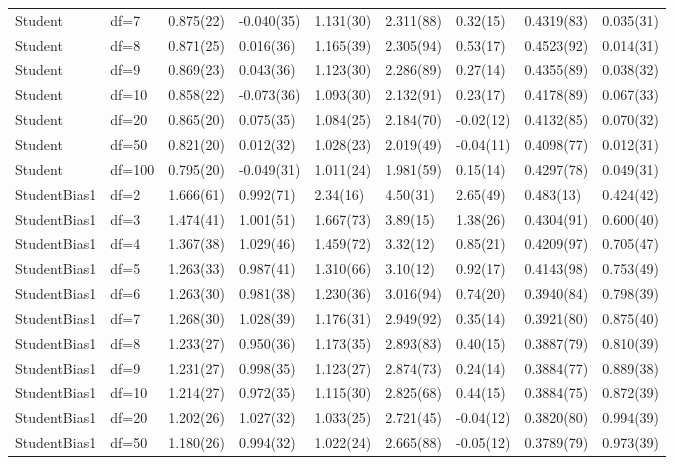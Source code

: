 \begin{table}[ht]
\begin{tabular}{lllllllll}
  Student & df=7 & 0.875(22) & -0.040(35) & 1.131(30) & 2.311(88) & 0.32(15) & 0.4319(83) & 0.035(31) \\ 
  Student & df=8 & 0.871(25) & 0.016(36) & 1.165(39) & 2.305(94) & 0.53(17) & 0.4523(92) & 0.014(31) \\ 
  Student & df=9 & 0.869(23) & 0.043(36) & 1.123(30) & 2.286(89) & 0.27(14) & 0.4355(89) & 0.038(32) \\ 
  Student & df=10 & 0.858(22) & -0.073(36) & 1.093(30) & 2.132(91) & 0.23(17) & 0.4178(89) & 0.067(33) \\ 
  Student & df=20 & 0.865(20) & 0.075(35) & 1.084(25) & 2.184(70) & -0.02(12) & 0.4132(85) & 0.070(32) \\ 
  Student & df=50 & 0.821(20) & 0.012(32) & 1.028(23) & 2.019(49) & -0.04(11) & 0.4098(77) & 0.012(31) \\ 
  Student & df=100 & 0.795(20) & -0.049(31) & 1.011(24) & 1.981(59) & 0.15(14) & 0.4297(78) & 0.049(31) \\ 
  StudentBias1 & df=2 & 1.666(61) & 0.992(71) & 2.34(16) & 4.50(31) & 2.65(49) & 0.483(13) & 0.424(42) \\ 
  StudentBias1 & df=3 & 1.474(41) & 1.001(51) & 1.667(73) & 3.89(15) & 1.38(26) & 0.4304(91) & 0.600(40) \\ 
  StudentBias1 & df=4 & 1.367(38) & 1.029(46) & 1.459(72) & 3.32(12) & 0.85(21) & 0.4209(97) & 0.705(47) \\ 
  StudentBias1 & df=5 & 1.263(33) & 0.987(41) & 1.310(66) & 3.10(12) & 0.92(17) & 0.4143(98) & 0.753(49) \\ 
  StudentBias1 & df=6 & 1.263(30) & 0.981(38) & 1.230(36) & 3.016(94) & 0.74(20) & 0.3940(84) & 0.798(39) \\ 
  StudentBias1 & df=7 & 1.268(30) & 1.028(39) & 1.176(31) & 2.949(92) & 0.35(14) & 0.3921(80) & 0.875(40) \\ 
  StudentBias1 & df=8 & 1.233(27) & 0.950(36) & 1.173(35) & 2.893(83) & 0.40(15) & 0.3887(79) & 0.810(39) \\ 
  StudentBias1 & df=9 & 1.231(27) & 0.998(35) & 1.123(27) & 2.874(73) & 0.24(14) & 0.3884(77) & 0.889(38) \\ 
  StudentBias1 & df=10 & 1.214(27) & 0.972(35) & 1.115(30) & 2.825(68) & 0.44(15) & 0.3884(75) & 0.872(39) \\ 
  StudentBias1 & df=20 & 1.202(26) & 1.027(32) & 1.033(25) & 2.721(45) & -0.04(12) & 0.3820(80) & 0.994(39) \\ 
  StudentBias1 & df=50 & 1.180(26) & 0.994(32) & 1.022(24) & 2.665(88) & -0.05(12) & 0.3789(79) & 0.973(39) \\ 

\end{tabular}
\end{table}
